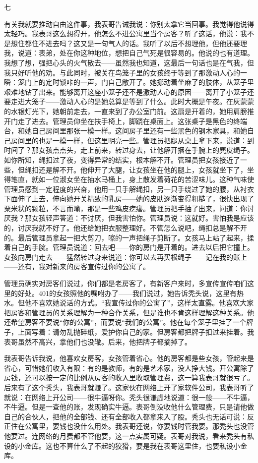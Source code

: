 七 

有关我就要推动自由这件事，我表哥告诫我说：你别太拿它当回事。我觉得他说得太轻巧。我表哥这么想得开，他怎么不进公寓里当个房客？听了这话，他说：我不是想住都住不进去吗？这又是一句气人的话。我听了以后不想理他，但他还要理我，说道：表弟，处在你这种地位，想把自己气死是很容易的。他说的也有道理。我想了想，强把心头的火气散去——虽然我也知道，这最后一句话也是在气我，但我只好听他的劝。与此同时，被关在鸟笼子里的女孩终于等到了那激动人心的一瞬：笼门上的定时锁咔的一声，门自己敞开了。她挪动着坐麻了的肢体，从笼子里艰难地钻了出来。能够离开这座小笼子还不是激动人心的原因——离开了小笼子还要走进大笼子——激动人心的是她总算是等到了什么。此时大概是午夜。在灰蒙蒙的水银灯光下，她朝前走去，一直来到了办公室门前。这扇是开着的，她用肩膀推开门走了进去。管理员仰坐在扶手椅上，脚跷在桌面上。这张桌子是黑色的终端台，和她自己房间里那张一模一样。这间房子里还有一些黑色的钢木家具，和她自己房间里的也是一模一样，但这里明亮一些。管理员把腿从桌上拿下来，说道：到时间了？那女孩点点头，走上前来，转过身去，让他解开捆在手腕上的麂皮绳子。如你所知，绳扣过了夜，变得异常的结实，根本解不开。管理员把女孩接近了一些，但绳扣还是解不开。他伸开了大腿，让女孩坐在他的腿上，女孩就坐下了，坐得笔直，就如一位淑女坐在抽水马桶上，身上散发着荷花的苦涩味儿。这种气味使管理员感到一定程度的兴奋，他用一只手解绳扣，另一只手绕过了她的腰，从衬衣下面伸了上去，伸向她开关精致的乳房——她的皮肤逐渐变得粗糙了，很快出现了粟米状的颗粒，不言而喻，那是一些鸡皮疙瘩。管理员把手抽了出来，问道：你讨厌我？那女孩轻声答道：不讨厌，但我害怕你。管理员说：这就好。害怕我是应该的，讨厌我就不好了。他还给她把衣服整理好。不管怎么说吧，绳扣总是解不开的。最后管理员拿起一把大剪刀，嚓的一声把绳子剪断了。女孩马上站了起来，揉着自己的手腕。管理员说道：回去吧——你的房门是开着的。进去以后把它撞上。女孩向房门走去——猛然转过身来说道：你可以去再买根绳子——记在我的账上——还有，我对新来的房客宣传过你的公寓了。 

管理员确实对房客们说过，你们都是老房客了，有新客户来时，多宣传宣传咱们这里的好处。401的女孩照他的嘱咐办了——我们说过，她告诉秃头说，这里有热水。但他不喜欢她说话的方式。“我宣传过你的公寓了”，这样太直露。他喜欢大家把房客和管理员的关系理解为一种合作关系，但是谁也不肯这样理解这种关系。他还希望房客不要说“你的公寓”，而要说“我们的公寓”。他在每个笼子里挂了一个牌子，上面写着：请勿乱抛碎纸，爱护你自己的家。但房客都把牌子扣过来挂着。我表哥虽然不高兴，拿他们也没辙。后来，他把牌子都摘掉了。 

我表哥告诉我说，他喜欢女房客，女孩管着省心。他的房客都是些女孩，管起来是省心，可惜她们收入有限：有的是教师，有的是艺术家，没人挣大钱。开公寓除了房钱，还可以按一定的比例从房客的收入里收取管理费，这一算我表哥就很亏了。后来有了这个秃头，我表哥就赚了。这家伙在网络上开了家软件公司，我表哥听了就说：在网络上开公司——很牛逼呀你。秃头很谦虚地说道：很一般——不牛逼，不牛逼。但是一查他的账，发现确实牛逼。表哥倒没收他什么管理费，只是请他做自己的合伙人，把他的全部钱、还有全部收入都拿来入了股。秃头也无话可说：反正住在公寓里，要钱也没什么用处。我表哥还说，你要钱时管我要。那秃头也没管他要过。连网络的月费都不管他要，这一点实属可疑。表哥对我说，看来秃头有私设的小金库。这也不算什么了不起的狡猾，要是我在表哥这里住，也要私设小金库。 

